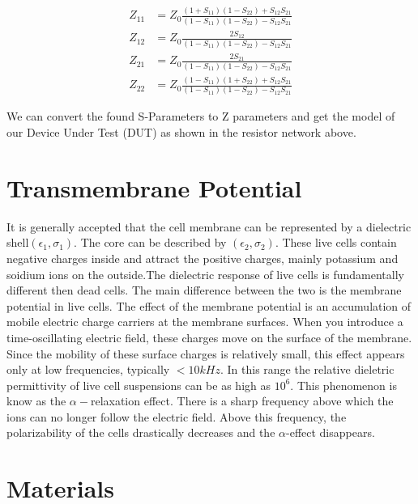 \documentclass[journal]{IEEEtran}
\begin{document}
\begin{align*}
\label{s-conversion-z}
Z_{11} &= Z_0\frac{(1+S_{11})(1-S_{22})+S_{12}S_{21}}{ (1-S_{11})(1-S_{22})-S_{12}S_{21}} \\
Z_{12} &= Z_0\frac{2S_{12}}{ (1-S_{11})(1-S_{22})-S_{12}S_{21}} \\
Z_{21} &= Z_0\frac{2S_{21}}{ (1-S_{11})(1-S_{22})-S_{12}S_{21}} \\
Z_{22} &= Z_0\frac{ (1-S_{11})(1+S_{22})+S_{12}S_{21}}{ (1-S_{11})(1-S_{22})-S_{12}S_{21}}
\end{align*}

We can convert the found S-Parameters to Z parameters and get the model of our Device Under Test (DUT) as shown in the resistor network above.

\section{Transmembrane Potential}
It is generally accepted that the cell membrane can be represented by a dielectric shell$(\epsilon_1,\sigma_1)$. The core can be described by $(\epsilon_2,\sigma_2)$. These live cells contain negative charges inside and attract the positive charges, mainly potassium and soidium ions on the outside.The dielectric response of live cells is fundamentally different then dead cells. The main difference between the two is the membrane potential in live cells. The effect of the membrane potential is an accumulation of mobile electric charge carriers at the membrane surfaces. When you introduce a time-oscillating electric field, these charges move on the surface of the membrane. Since the mobility of these surface charges is relatively small, this effect appears only at low frequencies, typically $<10kHz$. In this range the relative dieletric permittivity of live cell suspensions can be as high as $10^6$. This phenomenon is know as the $\alpha-$relaxation effect\cite{dielectric-response}. There is a sharp frequency above which the ions can no longer follow the electric field. Above this frequency, the polarizability of the cells drastically decreases and the $\alpha$-effect disappears.

\section{Materials}
\end{document}
